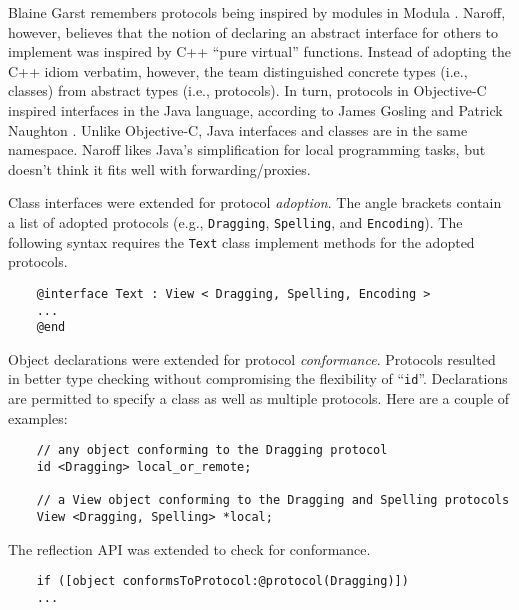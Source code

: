 \documentclass[acmsmall,screen]{acmart}
\begin{document}
Blaine Garst remembers protocols being inspired by modules in Modula \citep[22--25, 54]{garst_oral_2016}. Naroff, however, believes that the notion of declaring an abstract interface for others to implement was inspired by C++ ``pure virtual'' functions. Instead of adopting the C++ idiom verbatim, however, the team distinguished concrete types (i.e., classes) from abstract types (i.e., protocols). In turn, protocols in Objective-C inspired interfaces in the Java language, according to James Gosling \citep[13--14]{gosling_oral_2019} and Patrick Naughton . Unlike Objective-C, Java interfaces and classes are in the same namespace. Naroff likes Java's simplification for local programming tasks, but doesn't think it fits well with forwarding/proxies. 

Class interfaces were extended for protocol \emph{adoption}. The angle brackets contain a list of adopted protocols (e.g., \verb$Dragging$, \verb$Spelling$, and \verb$Encoding$). The following syntax requires the \verb$Text$ class implement methods for the adopted protocols. 
\begin{verbatim}
    @interface Text : View < Dragging, Spelling, Encoding >
    ...
    @end
\end{verbatim}
Object declarations were extended for protocol \emph{conformance}. Protocols resulted in better type checking without compromising the flexibility of ``\verb$id$''. Declarations are permitted to specify a class as well as multiple protocols. Here are a couple of examples:
\begin{verbatim}
    // any object conforming to the Dragging protocol
    id <Dragging> local_or_remote; 

    // a View object conforming to the Dragging and Spelling protocols
    View <Dragging, Spelling> *local; 
\end{verbatim}
The reflection API was extended to check for conformance.
\begin{verbatim}
    if ([object conformsToProtocol:@protocol(Dragging)])
    ...
\end{verbatim}
\end{document}
